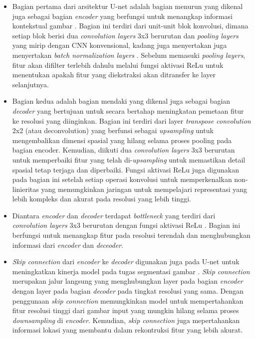 \begin{itemize}
	\item Bagian pertama dari arsitektur U-net adalah bagian menurun yang dikenal juga sebagai bagian \textit{encoder} yang berfungsi untuk menangkap informasi kontekstual gambar \cite{azad_medical_2022}. Bagian ini terdiri dari unit-unit blok konvolusi, dimana setiap blok berisi dua \textit{convolution layers} 3x3 berurutan dan \textit{pooling layers} yang mirip dengan CNN konvensional, kadang juga menyertakan juga menyertakan \textit{batch normalization layers} \cite{younisse_fine-tuning_2023}. Sebelum memasuki \textit{pooling layers}, fitur akan difilter terlebih dahulu melalui fungsi aktivasi ReLu untuk menentukan apakah fitur yang diekstraksi akan ditransfer ke layer selanjutnya.
	
	\item Bagian kedua adalah bagian mendaki yang dikenal juga sebagai bagian \textit{decoder} yang bertujuan untuk secara bertahap meningkatan pemetaan fitur ke resolusi yang diinginkan\cite{siddique_u-net_2020}. Bagian ini terdiri dari layer \textit{transpose convolution} 2x2 (atau deconvolution) yang berfunsi sebagai \textit{upsampling} untuk mengembalikan dimensi spasial yang hilang selama proses pooling pada bagian encoder. Kemudian, diikuti dua \textit{convolution layers} 3x3 berurutan untuk memperbaiki fitur yang telah di-\textit{upsampling} untuk memastikan detail spasial tetap terjaga dan diperbaiki\cite{purushothaman_image_2022}. Fungsi aktivasi ReLu juga digunakan pada bagian ini setelah setiap operasi konvolusi untuk memperkenalkan non-linieritas yang memungkinkan jaringan untuk mempelajari representasi yang lebih kompleks dan akurat pada resolusi yang lebih tinggi\cite{huang_fully_2022}.
	
	\item Diantara \textit{encoder} dan \textit{decoder} terdapat \textit{bottleneck} yang terdiri dari \textit{convolution layers} 3x3 berurutan dengan fungsi aktivasi ReLu \cite{azad_medical_2022}. Bagian ini berfungsi untuk menangkap fitur pada resolusi terendah dan menghubungkan informasi dari \textit{encoder} dan \textit{deceoder}.
	
	\item \textit{Skip connection} dari \textit{encoder} ke \textit{decoder} digunakan juga pada U-net untuk meningkatkan kinerja model pada tugas segmentasi gambar \cite{azad_medical_2022}. \textit{Skip connection}  merupakan jalur langsung yang menghubungkan layer pada bagian \textit{encoder} dengan layer pada bagian \textit{decoder} pada tingkat resolusi yang sama. Dengan penggunaan \textit{skip connection} memungkinkan model untuk mempertahankan fitur resolusi tinggi dari gambar input yang mungkin hilang selama proses \textit{downsampling} di \textit{encoder}. Kemudian,\textit{ skip connection} juga mepertahankan informasi lokasi yang membantu dalam rekontruksi fitur yang lebih akurat\cite{siddique_u-net_2020}.
	

\end{itemize}
